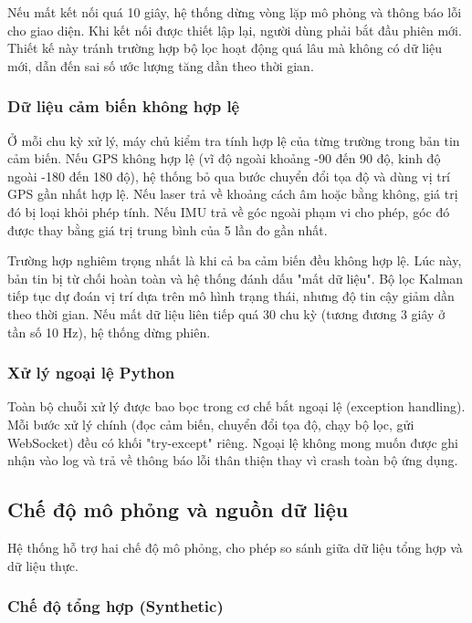 Nếu mất kết nối quá 10 giây, hệ thống dừng vòng lặp mô phỏng và thông báo lỗi cho giao diện. Khi kết nối được thiết lập lại, người dùng phải bắt đầu phiên mới. Thiết kế này tránh trường hợp bộ lọc hoạt động quá lâu mà không có dữ liệu mới, dẫn đến sai số ước lượng tăng dần theo thời gian.

\subsubsection{Dữ liệu cảm biến không hợp lệ}

\hspace{0.5cm} Ở mỗi chu kỳ xử lý, máy chủ kiểm tra tính hợp lệ của từng trường trong bản tin cảm biến. Nếu GPS không hợp lệ (vĩ độ ngoài khoảng -90 đến 90 độ, kinh độ ngoài -180 đến 180 độ), hệ thống bỏ qua bước chuyển đổi tọa độ và dùng vị trí GPS gần nhất hợp lệ. Nếu laser trả về khoảng cách âm hoặc bằng không, giá trị đó bị loại khỏi phép tính. Nếu IMU trả về góc ngoài phạm vi cho phép, góc đó được thay bằng giá trị trung bình của 5 lần đo gần nhất.

Trường hợp nghiêm trọng nhất là khi cả ba cảm biến đều không hợp lệ. Lúc này, bản tin bị từ chối hoàn toàn và hệ thống đánh dấu "mất dữ liệu". Bộ lọc Kalman tiếp tục dự đoán vị trí dựa trên mô hình trạng thái, nhưng độ tin cậy giảm dần theo thời gian. Nếu mất dữ liệu liên tiếp quá 30 chu kỳ (tương đương 3 giây ở tần số 10 Hz), hệ thống dừng phiên.

\subsubsection{Xử lý ngoại lệ Python}

\hspace{0.5cm} Toàn bộ chuỗi xử lý được bao bọc trong cơ chế bắt ngoại lệ (exception handling). Mỗi bước xử lý chính (đọc cảm biến, chuyển đổi tọa độ, chạy bộ lọc, gửi WebSocket) đều có khối "try-except" riêng. Ngoại lệ không mong muốn được ghi nhận vào log và trả về thông báo lỗi thân thiện thay vì crash toàn bộ ứng dụng.

\subsection{Chế độ mô phỏng và nguồn dữ liệu}

\hspace{0.5cm} Hệ thống hỗ trợ hai chế độ mô phỏng, cho phép so sánh giữa dữ liệu tổng hợp và dữ liệu thực.

\subsubsection{Chế độ tổng hợp (Synthetic)}

